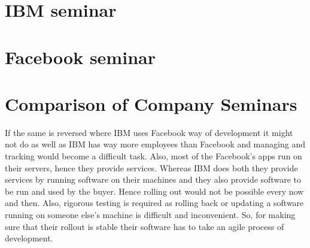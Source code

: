 \section{IBM seminar}


\section{Facebook seminar}



% 

\section{Comparison of Company Seminars}

If the same is reversed where IBM uses Facebook way of development it might not do as well as IBM has way more employees than Facebook and managing and tracking would become a difficult task. Also, most of the Facebook's apps run on their servers, hence they provide services. Whereas IBM does both they provide services by running software on their machines and they also provide software to be run and used by the buyer. Hence rolling out would not be possible every now and then. Also, rigorous testing is required as rolling back or updating a software running on someone else's machine is difficult and inconvenient. So, for making sure that their rollout is stable their software has to take an agile process of development.
